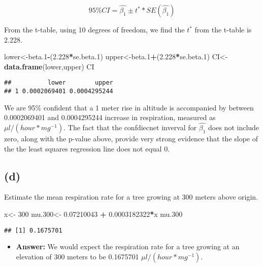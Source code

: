 \documentclass[]{article}
\newenvironment{Shaded}{\begin{snugshade}}{\end{snugshade}}
\newcommand{\KeywordTok}[1]{\textcolor[rgb]{0.13,0.29,0.53}{\textbf{#1}}}
\newcommand{\DecValTok}[1]{\textcolor[rgb]{0.00,0.00,0.81}{#1}}
\newcommand{\FloatTok}[1]{\textcolor[rgb]{0.00,0.00,0.81}{#1}}
\newcommand{\StringTok}[1]{\textcolor[rgb]{0.31,0.60,0.02}{#1}}
\newcommand{\OperatorTok}[1]{\textcolor[rgb]{0.81,0.36,0.00}{\textbf{#1}}}
\newcommand{\NormalTok}[1]{#1}
\providecommand{\tightlist}{%
  \setlength{\itemsep}{0pt}\setlength{\parskip}{0pt}}
\begin{document}
\[
95\%CI = \hat{\beta_1} \pm t^* * SE(\hat{\beta_1})
\]

From the t-table, using 10 degrees of freedom, we find the \(t^*\) from
the t-table is 2.228.

\begin{Shaded}
\begin{Highlighting}[]
\NormalTok{lower<-beta.}\DecValTok{1}\OperatorTok{-}\NormalTok{(}\FloatTok{2.228}\OperatorTok{*}\NormalTok{se.beta.}\DecValTok{1}\NormalTok{)}
\NormalTok{upper<-beta.}\DecValTok{1}\OperatorTok{+}\NormalTok{(}\FloatTok{2.228}\OperatorTok{*}\NormalTok{se.beta.}\DecValTok{1}\NormalTok{)}
\NormalTok{CI<-}\KeywordTok{data.frame}\NormalTok{(lower,upper)}
\NormalTok{CI}
\end{Highlighting}
\end{Shaded}

\begin{verbatim}
##          lower        upper
## 1 0.0002069401 0.0004295244
\end{verbatim}

We are 95\% confident that a 1 meter rise in altitude is accompanied by
between 0.0002069401 and 0.0004295244 increase in respiration, measured
as \(\mu l/(hour*mg^{-1})\). The fact that the confdiecnet inverval for
\(\hat{\beta_1}\) does not include zero, along with the p-value above,
provide very strong evidence that the slope of the the least squares
regression line does not equal 0.

\subsection{(d)}\label{d}

Estimate the mean respiration rate for a tree growing at 300 meters
above origin.

\begin{Shaded}
\begin{Highlighting}[]
\NormalTok{x<-}\StringTok{ }\DecValTok{300}
\NormalTok{mu.}\DecValTok{300}\NormalTok{<-}\StringTok{ }\FloatTok{0.07210043} \OperatorTok{+}\StringTok{ }\FloatTok{0.0003182322}\OperatorTok{*}\NormalTok{x}
\NormalTok{mu.}\DecValTok{300}
\end{Highlighting}
\end{Shaded}

\begin{verbatim}
## [1] 0.1675701
\end{verbatim}

\begin{itemize}
\tightlist
\item
  \textbf{Answer:} We would expect the respiration rate for a tree
  growing at an elevation of 300 meters to be 0.1675701
  \(\mu l/(hour*mg^{-1})\).
\end{itemize}
\end{document}
